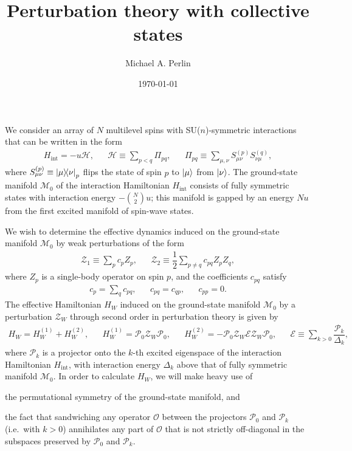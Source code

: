 \documentclass[nofootinbib,notitlepage,11pt]{revtex4-2}
\renewcommand{\t}{\text} %
\newcommand{\f}[2]{\dfrac{#1}{#2}} %
\newcommand{\1}{\mathds{1}}
\newcommand{\E}{\mathcal{E}}
\renewcommand{\H}{\mathcal{H}}
\newcommand{\M}{\mathcal{M}}
\renewcommand{\O}{\mathcal{O}}
\renewcommand{\P}{\mathcal{P}}
\newcommand{\Z}{\mathcal{Z}}
\begin{document}
\thispagestyle{fancy}

\title{Perturbation theory with collective states}%
\author{Michael A. Perlin}%
\date{\today}

\maketitle

We consider an array of $N$ multilevel spins with SU($n$)-symmetric
interactions that can be written in the form
\begin{align}
  H_{\t{int}} = -u \H,
  &&
  \H \equiv \sum_{p<q} \Pi_{pq},
  &&
  \Pi_{pq} \equiv \sum_{\mu,\nu} S_{\mu\nu}^{(p)} S_{\nu\mu}^{(q)},
\end{align}
where $S_{\mu\nu}^{(p)}\equiv\op{\mu}{\nu}_p$ flips the state of spin
$p$ to $\ket\mu$ from $\ket\nu$.  The ground-state manifold $\M_0$ of
the interaction Hamiltonian $H_{\t{int}}$ consists of fully symmetric
states with interaction energy $-{N\choose2}u$; this manifold is
gapped by an energy $Nu$ from the first excited manifold of spin-wave
states.

We wish to determine the effective dynamics induced on the
ground-state manifold $\M_0$ by weak perturbations of the form
\begin{align}
  \Z_1 \equiv \sum_p c_p Z_p,
  &&
  \Z_2 \equiv \f12 \sum_{p\ne q} c_{pq} Z_p Z_q,
\end{align}
where $Z_p$ is a single-body operator on spin $p$, and the
coefficients $c_{pq}$ satisfy
\begin{align}
  c_p = \sum_q c_{pq},
  &&
  c_{pq} = c_{qp},
  &&
  c_{pp} = 0.
\end{align}
The effective Hamiltonian $H_W$ induced on the ground-state manifold
$\M_0$ by a perturbation $\Z_W$ through second order in perturbation
theory is given by\cite{bravyi2011schrieffer, perlin2019effective}
\begin{align}
  H_W = H_W^{(1)} + H_W^{(2)},
  &&
  H_W^{(1)} = \P_0 \Z_W \P_0,
  &&
  H_W^{(2)} = - \P_0 \Z_W \E \Z_W \P_0,
  &&
  \E \equiv \sum_{k>0} \f{\P_k}{\Delta_k},
\end{align}
where $\P_k$ is a projector onto the $k$-th excited eigenspace of the
interaction Hamiltonian $H_{\t{int}}$, with interaction energy
$\Delta_k$ above that of fully symmetric manifold $\M_0$.  In order to
calculate $H_W$, we will make heavy use of
\begin{enumerate*}
\item the permutational symmetry of the ground-state manifold, and
\item the fact that sandwiching any operator $\O$ between the
  projectors $\P_0$ and $\P_k$ (i.e.~with $k>0$) annihilates any part
  of $\O$ that is not strictly off-diagonal in the subspaces preserved
  by $\P_0$ and $\P_k$.
\end{enumerate*}
\end{document}
